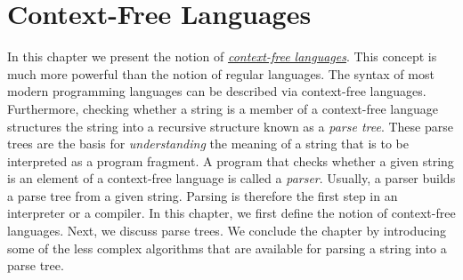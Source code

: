 \chapter{Context-Free Languages \label{chap:kontextfrei}}
In this chapter we present the notion of 
\href{http://en.wikipedia.org/wiki/Context-free_language}{\emph{context-free languages}}.
This concept is much more powerful than the notion of regular languages.  The syntax of most modern
programming languages can be described via context-free languages.  Furthermore, checking whether a
string is a member of a context-free language structures the string into a recursive structure known
as a \emph{parse tree}.  These parse trees are the basis for \emph{understanding} the meaning of a
string that is to be interpreted as a program fragment.  A program that checks whether a given
string is an element of a context-free language is called a \emph{parser}.  Usually, a parser builds
a parse tree from a given string.  Parsing is therefore the first step in an interpreter or a compiler.
In this chapter, we first define the notion of context-free languages.  Next, we discuss parse
trees.  We conclude the chapter by introducing some of the less complex algorithms that are
available for parsing a string into a parse tree.

